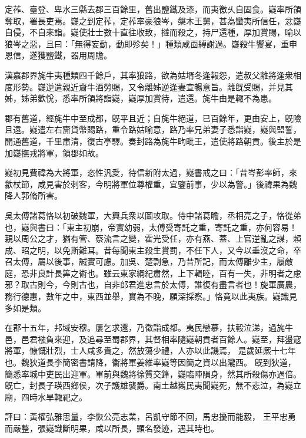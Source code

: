 \begin{pinyinscope}
 
 定莋、臺登、卑水三縣去郡三百餘里，舊出鹽鐵及漆，而夷徼乆自固食。嶷率所領奪取，署長吏焉。嶷之到定莋，定莋率豪狼岑，槃木王舅，甚為蠻夷所信任，忿嶷自侵，不自來詣。嶷使壯士數十直往收致，撻而殺之，持尸還種，厚加賞賜，喻以狼岑之惡，且曰：「無得妄動，動即殄矣！」種類咸靣縛謝過。嶷殺牛饗宴，重申恩信，遂獲鹽鐵，器用周贍。
 
 
 
 
 漢嘉郡界旄牛夷種類四千餘戶，其率狼路，欲為姑壻冬逢報怨，遣叔父離將逢衆相度形勢。嶷逆遣親近齎牛酒勞賜，又令離姊逆逢妻宣暢意旨。離旣受賜，并見其姊，姊弟歡恱，悉率所領將詣嶷，嶷厚加賞待，遣還。旄牛由是輙不為患。
 
 
 
 
 郡有舊道，經旄牛中至成都，旣平且近；自旄牛絕道，已百餘年，更由安上，旣險且遠。嶷遣左右齎貨幣賜路，重令路姑喻意，路乃率兄弟妻子悉詣嶷，嶷與盟誓，開通舊道，千里肅清，復古亭驛。奏封路為旄牛㽛毗王，遣使將路朝貢。後主於是加嶷撫戎將軍，領郡如故。
 
 
 
 
 嶷初見費禕為大將軍，恣性汎愛，待信新附太過，嶷書戒之曰：「昔岑彭率師，來歙杖節，咸見害於刺客，今明將軍位尊權重，宜鑒前事，少以為警。」後禕果為魏降人郭脩所害。
 
 
 
 
 吳太傅諸葛恪以初破魏軍，大興兵衆以圖攻取。侍中諸葛瞻，丞相亮之子，恪從弟也，嶷與書曰：「東主初崩，帝實幼弱，太傅受寄託之重，寄託之重，亦何容易！親以周公之才，猶有管、蔡流言之變，霍光受任，亦有燕、蓋、上官逆亂之謀，賴成、昭之明，以免斯難耳。昔每聞東主殺生賞罰，不任下人，又今以垂沒之命，卒召太傅，屬以後事，誠實可慮。加吳、楚剽急，乃昔所記，而太傅離少主，履敵庭，恐非良計長筭之術也。雖云東家綱紀肅然，上下輯睦，百有一失，非明者之慮邪？取古則今，今則古也，自非郎君進忠言於太傅，誰復有盡言者也！旋軍廣農，務行德惠，數年之中，東西並舉，實為不晚，願深採察。」恪竟以此夷族。嶷識見多如是類。
 
 
在郡十五年，邦域安穆。屢乞求還，乃徵詣成都。夷民戀慕，扶轂泣涕，過旄牛邑，邑君襁負來迎，及追尋至蜀郡界，其督相率隨嶷朝貢者百餘人。嶷至，拜盪寇將軍，慷慨壯烈，士人咸多貴之，然放蕩少禮，人亦以此譏焉，
 是歲延熈十七年也。魏狄道長李簡密書請降，衞將軍姜維率嶷等因簡之資以出隴西。
 旣到狄道，簡悉率城中吏民出迎軍。軍前與魏將徐質交鋒，嶷臨陣隕身，然其所殺傷亦過倍。旣亡，封長子瑛西鄉侯，次子護雄襲爵。南土越嶲民夷聞嶷死，無不悲泣，為嶷立廟，四時水旱輙祀之。
 
 
評曰：黃權弘雅思量，李恢公亮志業，呂凱守節不回，馬忠擾而能毅，
 王平忠勇而嚴整，張嶷識斷明果，咸以所長，顯名發迹，遇其時也。
 
 
\end{pinyinscope}